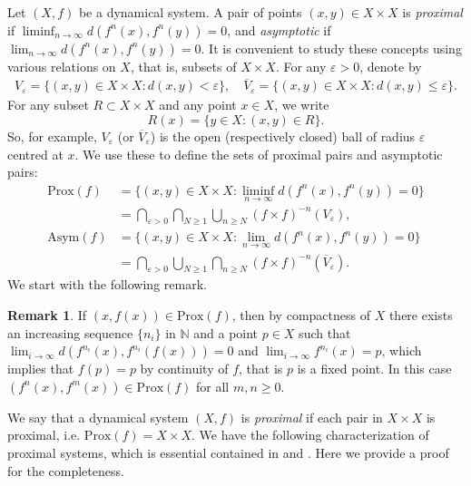 \documentclass[reqno,a4paper,12pt]{amsart}
\theoremstyle{definition}
\newtheorem{rem}[thm]{Remark}
\numberwithin{equation}{section}
\begin{document}
Let $(X,f)$ be a dynamical system.
A pair of points $(x,y)\in X\times X$ is \emph{proximal} if $\liminf_{n\to\infty} d(f^n(x),f^n(y))=0$, and
\emph{asymptotic} if $\lim_{n\to\infty} d(f^n(x),f^n(y))=0$.
It is convenient to study these concepts using various relations on $X$, that is, subsets of $X \times X$.
For any $\varepsilon>0$, denote by
\begin{align*}
  V_\varepsilon=\{(x,y)\in X\times X\colon d(x,y)<\varepsilon\},\quad
  \overline{V}\!_\varepsilon=\{(x,y)\in X\times X\colon d(x,y)\leq \varepsilon\}.
\end{align*}
For any subset $R\subset X \times X$ and any point $x\in X$, we write
\[R(x)=\{y\in X\colon (x,y)\in R\}.\]
So, for example,  $V_\varepsilon$ (or $\overline{V}\!_\varepsilon$)
is the open (respectively closed) ball of radius $\varepsilon$ centred at $x$.
We use these to define the sets of proximal pairs and asymptotic pairs:
\begin{align*}
  \mathrm{Prox}(f)&=\bigl\{(x,y)\in X\times X\colon \liminf_{n\to\infty} d(f^n(x),f^n(y))=0\bigr\}\\
                  &=\bigcap_{\varepsilon>0}\bigcap_{N\geq 1} \bigcup_{n\geq N} (f\times f)^{-n} (V_{\varepsilon}),\\
  \mathrm{Asym}(f)&=\bigl\{(x,y)\in X\times X\colon \lim_{n\to\infty} d(f^n(x),f^n(y))=0\bigr\}\\
                  &=\bigcap_{\varepsilon>0}\bigcup_{N\geq 1} \bigcap_{n\geq N} (f\times f)^{-n} (\overline{V}\!_{\varepsilon}).
\end{align*}
We start with the following remark.
\begin{rem}\label{rem:invariant-s-s}
If $(x,f(x))\in \mathrm{Prox}(f)$, then by compactness of $X$ there exists an increasing sequence
$\{n_i\}$ in ${\mathbb{N}}$ and a point $p\in X$
such that $\lim_{i\to\infty}d(f^{n_i}(x),f^{n_i}(f(x)))=0$ and $\lim_{i\to\infty}f^{n_i}(x)=p$,
which implies that $f(p)=p$ by continuity of $f$, that is $p$ is a fixed point.
In this case $(f^n(x),f^m(x))\in  \mathrm{Prox}(f)$ for all $m,n\geq 0$.
\end{rem}

We say that a dynamical system $(X,f)$ is \emph{proximal} if each pair in $X\times X$ is proximal,
i.e. $\mathrm{Prox}(f)=X\times X$.
We have the following characterization of proximal systems, which is essential contained in
 \cite[Proposition 2.2]{AK} and \cite[Proposition 2.2]{HYCS}.
Here we provide a proof for the completeness.
\end{document}

